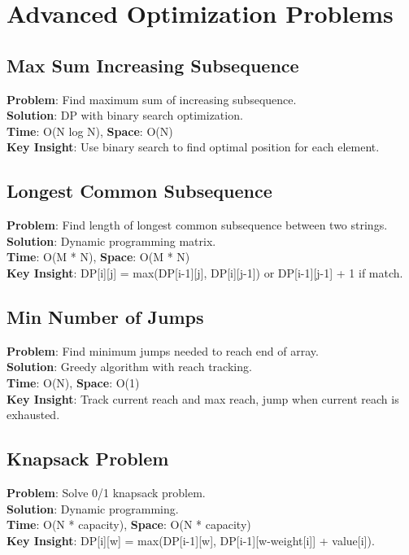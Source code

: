 \documentclass{report}
\begin{document}
\section{Advanced Optimization Problems}

\subsection{Max Sum Increasing Subsequence}
\textbf{Problem}: Find maximum sum of increasing subsequence.\\
\textbf{Solution}: DP with binary search optimization.\\
\textbf{Time}: O(N log N), \textbf{Space}: O(N)\\
\textbf{Key Insight}: Use binary search to find optimal position for each element.

\subsection{Longest Common Subsequence}
\textbf{Problem}: Find length of longest common subsequence between two strings.\\
\textbf{Solution}: Dynamic programming matrix.\\
\textbf{Time}: O(M * N), \textbf{Space}: O(M * N)\\
\textbf{Key Insight}: DP[i][j] = max(DP[i-1][j], DP[i][j-1]) or DP[i-1][j-1] + 1 if match.

\subsection{Min Number of Jumps}
\textbf{Problem}: Find minimum jumps needed to reach end of array.\\
\textbf{Solution}: Greedy algorithm with reach tracking.\\
\textbf{Time}: O(N), \textbf{Space}: O(1)\\
\textbf{Key Insight}: Track current reach and max reach, jump when current reach is exhausted.

\subsection{Knapsack Problem}
\textbf{Problem}: Solve 0/1 knapsack problem.\\
\textbf{Solution}: Dynamic programming.\\
\textbf{Time}: O(N * capacity), \textbf{Space}: O(N * capacity)\\
\textbf{Key Insight}: DP[i][w] = max(DP[i-1][w], DP[i-1][w-weight[i]] + value[i]).
\end{document}
